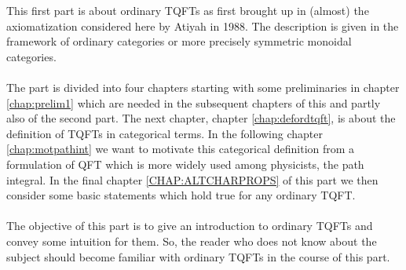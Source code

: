 This first part is about ordinary TQFTs as first brought up in (almost) the axiomatization considered here by Atiyah in 1988. The description is given in the framework of ordinary categories or more precisely symmetric monoidal categories.
\\\\
The part is divided into four chapters starting with some preliminaries in chapter \ref{chap:prelim1} which are needed in the subsequent chapters of this and partly also of the second part. The next chapter, chapter \ref{chap:defordtqft}, is about the definition of TQFTs in categorical terms. In the following chapter \ref{chap:motpathint} we want to motivate this categorical definition from a formulation of QFT which is more widely used among physicists, the path integral. In the final chapter \ref{CHAP:ALTCHARPROPS} of this part we then consider some basic statements which hold true for any ordinary TQFT.
\\\\
The objective of this part is to give an introduction to ordinary TQFTs and convey some intuition for them. So, the reader who does not know about the subject should become familiar with ordinary TQFTs in the course of this part.
